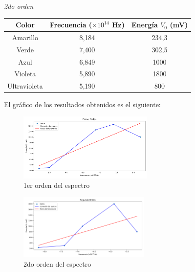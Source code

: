 \documentclass[a4paper]{article}
\begin{document}
      \begin{minipage}[c]{7.5cm}
        \vspace{5mm}
        \centering
        \textit{2do orden} 
        \vspace{2mm}
      \end{minipage}

      \begin{tabular}{ c c c }
        \toprule
        Color & Frecuencia ($\times 10^{14}$ Hz) & Energía $V_{0}$ (mV) \\
          \midrule
          Amarillo      & 8,184 & 234,3 \\
          Verde         & 7,400 & 302,5 \\
          Azul          & 6,849 & 1000  \\
          Violeta       & 5,890 & 1800  \\
          Ultravioleta  & 5,190 & 800   \\
        \bottomrule
      \end{tabular}

\newpage
\noindent
\thispagestyle{fancy}

      \indent El gráfico de los resultados obtenidos es el siguiente:

      \begin{figure}[h]
        \centering
        \includegraphics[width=6.7cm]{../imagenes/1er_orden.png}
        \caption{\small 1er orden del espectro}
      \end{figure} 

      \begin{figure}[ht]
        \centering
        \includegraphics[width=6.5cm]{../imagenes/2do_orden.png}
        \caption{\small 2do orden del espectro}
      \end{figure}
      \vspace{5mm}
\end{document}
